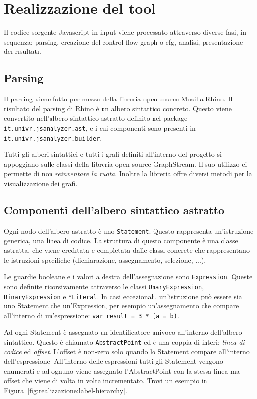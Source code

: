 \chapter{Realizzazione del tool}

Il codice sorgente Javascript in input viene processato attraverso diverse fasi, in sequenza: parsing, creazione del control flow graph o cfg, analisi, presentazione dei risultati.

\section{Parsing}

Il parsing viene fatto per mezzo della libreria open source Mozilla Rhino. Il risultato del parsing di Rhino è un albero sintattico concreto. Questo viene convertito nell'albero sintattico astratto definito nel package \texttt{it.univr.jsanalyzer.ast}, e i cui componenti sono presenti in \texttt{it.univr.jsanalyzer.builder}.

Tutti gli alberi sintattici e tutti i grafi definiti all'interno del progetto si appoggiano sulle classi della libreria open source GraphStream. Il suo utilizzo ci permette di non \emph{reinventare la ruota}. Inoltre la libreria offre diversi metodi per la visualizzazione dei grafi. 

\section{Componenti dell'albero sintattico astratto}

Ogni nodo dell'albero astratto è uno \texttt{Statement}. Questo rappresenta un'istruzione generica, una linea di codice. La struttura di questo componente è una classe astratta, che viene ereditata e completata dalle classi concrete che rappresentano le istruzioni specifiche (dichiarazione, assegnamento, selezione, ...). 

Le guardie booleane e i valori a destra dell'assegnazione sono \texttt{Expression}. Queste sono definite ricorsivamente attraverso le classi \texttt{UnaryExpression}, \texttt{Binary\-Expression} e \texttt{*Literal}. In casi eccezionali, un'istruzione può essere sia uno Statement che un'Expression, per esempio un'assegnamento che compare all'interno di un'espressione: \texttt{var result = 3 * (a = b)}.

Ad ogni Statement è assegnato un identificatore univoco all'interno dell'albero sintattico. Questo è chiamato \texttt{AbstractPoint} ed è una coppia di interi: \emph{linea di codice} ed \emph{offset}. L'offset è non-zero solo quando lo Statement compare all'interno dell'espressione. All'interno delle espressioni tutti gli Statement vengono enumerati e ad ognuno viene assegnato l'AbstractPoint con la stessa linea ma offset che viene di volta in volta incrementato. Trovi un esempio in Figura~\ref{fig:realizzazione:label-hierarchy}.

